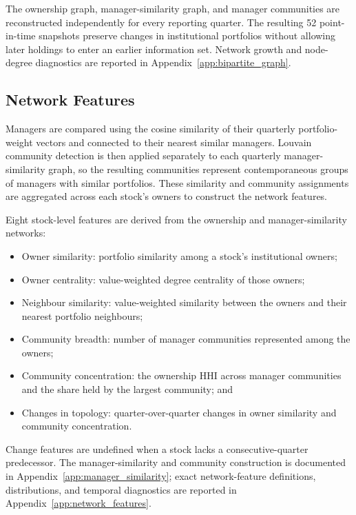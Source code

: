 The ownership graph, manager-similarity graph, and manager communities are reconstructed independently for every reporting quarter. The resulting 52 point-in-time snapshots preserve changes in institutional portfolios without allowing later holdings to enter an earlier information set. Network growth and node-degree diagnostics are reported in Appendix~\ref{app:bipartite_graph}.

\subsection{Network Features}
\label{sec:network_features}

Managers are compared using the cosine similarity of their quarterly portfolio-weight vectors and connected to their nearest similar managers. Louvain community detection is then applied separately to each quarterly manager-similarity graph, so the resulting communities represent contemporaneous groups of managers with similar portfolios. These similarity and community assignments are aggregated across each stock's owners to construct the network features.

Eight stock-level features are derived from the ownership and manager-similarity networks:

\begin{itemize}
    \item Owner similarity: portfolio similarity among a stock's institutional owners;
    \item Owner centrality: value-weighted degree centrality of those owners;
    \item Neighbour similarity: value-weighted similarity between the owners and their nearest portfolio neighbours;
    \item Community breadth: number of manager communities represented among the owners;
    \item Community concentration: the ownership HHI across manager communities and the share held by the largest community; and
    \item Changes in topology: quarter-over-quarter changes in owner similarity and community concentration.
\end{itemize}

\noindent
Change features are undefined when a stock lacks a consecutive-quarter predecessor. The manager-similarity and community construction is documented in Appendix~\ref{app:manager_similarity}; exact network-feature definitions, distributions, and temporal diagnostics are reported in Appendix~\ref{app:network_features}.
